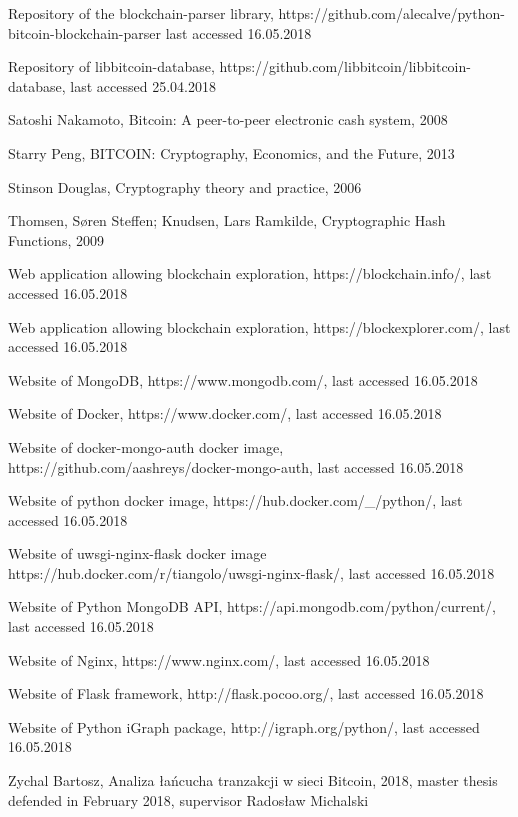 \documentclass[12pt, en, eng, oneside, final]{mgr}
\begin{document}
\begin{thebibliography}{9}
Repository of the blockchain-parser library, https://github.com/alecalve/python-bitcoin-blockchain-parser last accessed 16.05.2018 

Repository of libbitcoin-database, https://github.com/libbitcoin/libbitcoin-database, last accessed 25.04.2018

Satoshi Nakamoto, Bitcoin: A peer-to-peer electronic cash system, 2008

Starry Peng, BITCOIN: Cryptography, Economics, and the Future, 2013

Stinson Douglas, Cryptography theory and practice, 2006

Thomsen, Søren Steffen; Knudsen, Lars Ramkilde, Cryptographic Hash Functions, 2009

Web application allowing blockchain exploration, https://blockchain.info/, last accessed 16.05.2018

Web application allowing blockchain exploration, https://blockexplorer.com/, last accessed 16.05.2018

Website of MongoDB, https://www.mongodb.com/, last accessed 16.05.2018

Website of Docker, https://www.docker.com/, last accessed 16.05.2018

Website of docker-mongo-auth docker image, https://github.com/aashreys/docker-mongo-auth, last accessed 16.05.2018

Website of python docker image, https://hub.docker.com/\_/python/, last accessed 16.05.2018

Website of uwsgi-nginx-flask docker image https://hub.docker.com/r/tiangolo/uwsgi-nginx-flask/, last accessed 16.05.2018

Website of Python MongoDB API, https://api.mongodb.com/python/current/, last accessed 16.05.2018

Website of Nginx, https://www.nginx.com/, last accessed 16.05.2018

Website of Flask framework, http://flask.pocoo.org/, last accessed 16.05.2018

Website of Python iGraph package, http://igraph.org/python/, last accessed 16.05.2018

Zychal Bartosz, Analiza łańcucha tranzakcji w sieci Bitcoin, 2018, master thesis defended in February 2018, supervisor Radosław Michalski

\end{thebibliography}



\lstlistoflistings

\listoffigures
\end{document}
